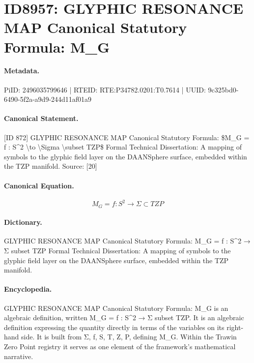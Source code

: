 \section*{ID8957: GLYPHIC RESONANCE MAP Canonical Statutory Formula: M\_G}
\paragraph{Metadata.}
PiID: 2496035799646 | RTEID: RTE:P34782.0201:T0.7614 | UUID: 9c325bd0-6490-5f2a-a9d9-244d11af01a9

\paragraph{Canonical Statement.}
[ID 872] GLYPHIC RESONANCE MAP Canonical Statutory Formula: \$M\_G = f : S\textasciicircum{}2 \textbackslash{}to \textbackslash{}Sigma \textbackslash{}subset TZP\$ Formal Technical Dissertation: A mapping of symbols to the glyphic field layer on the DAANSphere surface, embedded within the TZP manifold. Source: [20]

\paragraph{Canonical Equation.}
\[
M_G = f : S^2 \to \Sigma \subset TZP
\]

\paragraph{Dictionary.}
GLYPHIC RESONANCE MAP Canonical Statutory Formula: M\_G = f : S\textasciicircum{}2 → Σ subset TZP Formal Technical Dissertation: A mapping of symbols to the glyphic field layer on the DAANSphere surface, embedded within the TZP manifold.

\paragraph{Encyclopedia.}
GLYPHIC RESONANCE MAP Canonical Statutory Formula: M\_G is an algebraic definition, written M\_G = f : S\textasciicircum{}2 → Σ subset TZP. It is an algebraic definition expressing the quantity directly in terms of the variables on its right-hand side. It is built from Σ, f, S, T, Z, P, defining M\_G. Within the Trawin Zero Point registry it serves as one element of the framework's mathematical narrative.
